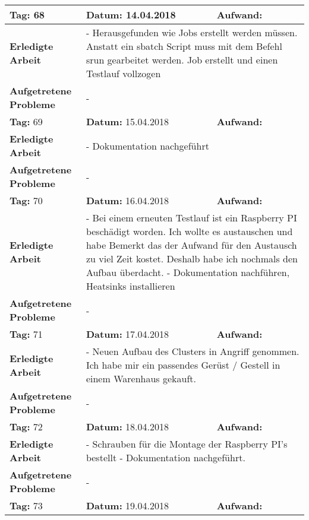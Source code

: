 \begin{longtable}{|p{5cm}|p{5cm}|p{6cm}|}
\rowcolor{heading}\textbf{Tag:} 68 & \textbf{Datum:} 14.04.2018 & \textbf{Aufwand:} \\ \hline
\textbf{Erledigte Arbeit} & \multicolumn{2}{p{11cm}|}{- Herausgefunden wie Jobs erstellt werden müssen. Anstatt ein sbatch Script muss mit dem Befehl srun gearbeitet werden. Job erstellt und einen Testlauf vollzogen} \\ \hline
\textbf{Aufgetretene Probleme} & \multicolumn{2}{p{11cm}|}{-} \\ \hline
\rowcolor{heading}\textbf{Tag:} 69 & \textbf{Datum:} 15.04.2018 & \textbf{Aufwand:} \\ \hline
\textbf{Erledigte Arbeit} & \multicolumn{2}{p{11cm}|}{- Dokumentation nachgeführt} \\ \hline
\textbf{Aufgetretene Probleme} & \multicolumn{2}{p{11cm}|}{-} \\ \hline
\rowcolor{heading}\textbf{Tag:} 70 & \textbf{Datum:} 16.04.2018 & \textbf{Aufwand:} \\ \hline
\textbf{Erledigte Arbeit} & \multicolumn{2}{p{11cm}|}{- Bei einem erneuten Testlauf ist ein Raspberry PI beschädigt worden. Ich wollte es austauschen und habe Bemerkt das der Aufwand für den Austausch zu viel Zeit kostet. Deshalb habe ich nochmals den Aufbau überdacht. \newline 
- Dokumentation nachführen, Heatsinks installieren} \\ \hline
\textbf{Aufgetretene Probleme} & \multicolumn{2}{p{11cm}|}{-} \\ \hline
\rowcolor{heading}\textbf{Tag:} 71 & \textbf{Datum:} 17.04.2018 & \textbf{Aufwand:} \\ \hline
\textbf{Erledigte Arbeit} & \multicolumn{2}{p{11cm}|}{- Neuen Aufbau des Clusters in Angriff genommen. Ich habe mir ein passendes Gerüst / Gestell in einem Warenhaus gekauft. } \\ \hline
\textbf{Aufgetretene Probleme} & \multicolumn{2}{p{11cm}|}{-} \\ \hline
\rowcolor{heading}\textbf{Tag:} 72 & \textbf{Datum:} 18.04.2018 & \textbf{Aufwand:} \\ \hline
\textbf{Erledigte Arbeit} & \multicolumn{2}{p{11cm}|}{- Schrauben für die Montage der Raspberry PI's bestellt \newline
- Dokumentation nachgeführt.} \\ \hline
\textbf{Aufgetretene Probleme} & \multicolumn{2}{p{11cm}|}{-} \\ \hline
\rowcolor{heading}\textbf{Tag:} 73 & \textbf{Datum:} 19.04.2018 & \textbf{Aufwand:} \\ \hline

\end{longtable}
